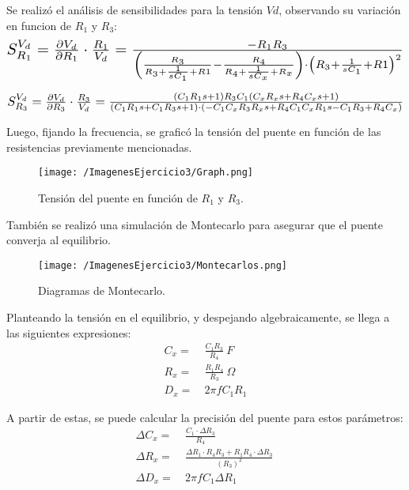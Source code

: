 Se realizó el análisis de sensibilidades para la tensión $Vd$, observando su variación en funcion de $R_1$ y $R_3$:
\begin{align*}
\scalebox{1.5}{$
S_{R_1}^{V_d} = \frac{\partial V_d}{\partial R_1} \cdot \frac{R_1}{V_d}=
\frac{-R_1R_3}{\left( \frac{R_3}{R_3+\frac{1}{sC_1}+R1}-\frac{R_4}{R_4+\frac{1}{sC_x}+R_x} \right) \cdot  \left( R_3+\frac{1}{sC_1}+R1\right)^2}
$}
\end{align*}

\begin{align*}
\scalebox{1.5}{$
S_{R_3}^{V_d} = \frac{\partial V_d}{\partial R_3} \cdot \frac{R_3}{V_d}=\frac{(C_1R_1s+1)R_3C_1(C_xR_xs+R_4C_xs+1)}{(C_1R_1s+C_1R_3s+1)\cdot (-C_1C_xR_3R_xs+R_4C_1C_xR_1s-C_1R_3+R_4C_x)}
$}
\end{align*}

Luego, fijando la frecuencia, se graficó la tensión del puente en función de las resistencias previamente mencionadas.
\begin{figure}[H]
	\centering
	\texttt{[image: /ImagenesEjercicio3/Graph.png]}
	\caption{Tensión del puente en función de $R_1$ y $R_3$.}
	\label{fig:graph1}
\end{figure}

También se realizó una simulación de Montecarlo para asegurar que el puente converja al equilibrio.
\begin{figure}[H]
	\centering
	\texttt{[image: /ImagenesEjercicio3/Montecarlos.png]}
	\caption{Diagramas de Montecarlo.}	
	\label{fig:graph2}
\end{figure}

Planteando la tensión en el equilibrio, y despejando algebraicamente, se llega a las siguientes expresiones:
\begin{equation*}
\begin{split}
	C_{x} =& \ \frac{C_1R_3}{R_4}\ F \\
	R_{x} =& \ \frac{R_1R_4}{R_3}\ \Omega \\
	D_{x} =& \ 2\pi f C_1R_1 
\end{split}
\end{equation*}

A partir de estas, se puede calcular la precisión del puente para estos parámetros:
\begin{equation*}
\begin{split}
	\Delta C_{x} =& \ \frac{C_1 \cdot \Delta R_3}{R_4}\  \\
	\Delta R_{x} =& \ \frac{\Delta R_1 \cdot R_4  R_3+R_1  R_4 \cdot \Delta R_3}{(R_3)^2}\  \\
	\Delta D_{x} =& \ 2\pi f C_1 \Delta R_1 
\end{split}
\end{equation*}

